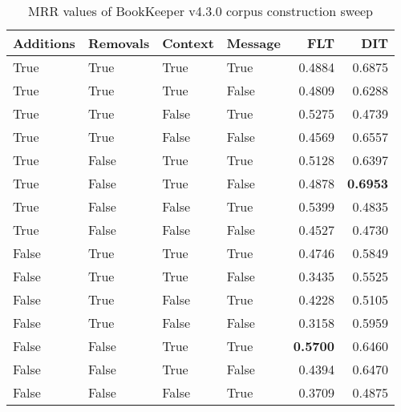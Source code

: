
\begin{table}
\begin{spacing}{1.2}
\centering
\caption{MRR values of BookKeeper v4.3.0 corpus construction sweep}
\label{table:bookkeeper_corpus_sweep}
\vspace{0.2em}
\begin{tabular}{llll|rr}
\toprule
Additions & Removals & Context & Message & FLT &       DIT \\
\midrule
     True &     True &    True &    True &           0.4884 &       0.6875 \\
     True &     True &    True &   False &           0.4809 &       0.6288 \\
     True &     True &   False &    True &           0.5275 &       0.4739 \\
     True &     True &   False &   False &           0.4569 &       0.6557 \\
     True &    False &    True &    True &           0.5128 &       0.6397 \\
     True &    False &    True &   False &           0.4878 & {\bf 0.6953} \\
     True &    False &   False &    True &           0.5399 &       0.4835 \\
     True &    False &   False &   False &           0.4527 &       0.4730 \\
    False &     True &    True &    True &           0.4746 &       0.5849 \\
    False &     True &    True &   False &           0.3435 &       0.5525 \\
    False &     True &   False &    True &           0.4228 &       0.5105 \\
    False &     True &   False &   False &           0.3158 &       0.5959 \\
    False &    False &    True &    True &     {\bf 0.5700} &       0.6460 \\
    False &    False &    True &   False &           0.4394 &       0.6470 \\
    False &    False &   False &    True &           0.3709 &       0.4875 \\
\bottomrule
\end{tabular}

\end{spacing}
\end{table}
